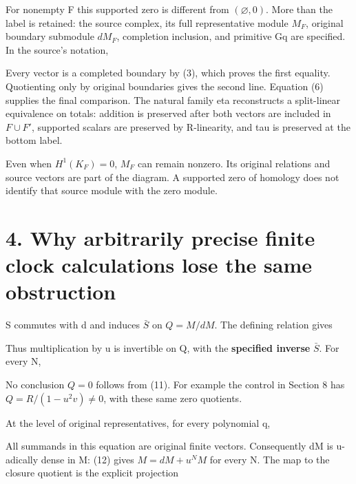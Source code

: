 
For nonempty F this supported zero is different from
\((\varnothing,0)\). More than the label is retained: the source
complex, its full representative module \(M_F\), original boundary
submodule \(dM_F\), completion inclusion, and primitive Gq are
specified. In the source's notation,


Every vector is a completed boundary by (3), which proves the first
equality. Quotienting only by original boundaries gives the second line.
Equation (6) supplies the final comparison. The natural family eta
reconstructs a split-linear equivalence on totals: addition is preserved
after both vectors are included in \(F\cup F'\), supported scalars are
preserved by R-linearity, and tau is preserved at the bottom label.

Even when \(H^1(K_F)=0\), \(M_F\) can remain nonzero. Its original
relations and source vectors are part of the diagram. A supported zero
of homology does not identify that source module with the zero module.

\section{4. Why arbitrarily precise finite clock calculations lose the
same obstruction}

S commutes with d and induces \(\bar S\) on \(Q=M/dM\). The defining
relation gives


Thus multiplication by u is invertible on Q, with the \textbf{specified
inverse} \(\bar S\). For every N,


No conclusion \(Q=0\) follows from (11). For example the control in
Section 8 has \(Q=R/(1-u^2v)\ne0\), with these same zero quotients.

At the level of original representatives, for every polynomial q,


All summands in this equation are original finite vectors. Consequently
dM is u-adically dense in M: (12) gives \(M=dM+u^NM\) for every N. The
map to the closure quotient is the explicit projection

